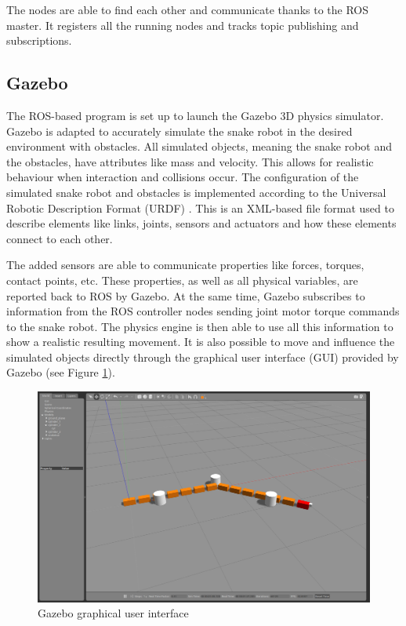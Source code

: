 The nodes are able to find each other and communicate thanks to the ROS master. It registers all the 
running nodes and tracks topic publishing and subscriptions.

\subsection{Gazebo}

The ROS-based program is set up to launch the Gazebo 3D physics simulator. Gazebo is adapted to accurately simulate the snake robot in the desired environment with obstacles. All simulated objects, meaning the snake robot and the obstacles, have attributes like mass and velocity. This allows for realistic behaviour when interaction and collisions occur. The configuration of the simulated snake robot and obstacles is implemented according to the Universal Robotic Description Format (URDF) \cite{urdfWeb}. This is an XML-based file format used to describe elements like links, joints, sensors and actuators and how these elements connect to each other.

The added sensors are able to communicate properties like forces, torques, contact points, etc. These properties, as well as all physical variables, are reported back to ROS by Gazebo.
At the same time, Gazebo subscribes to information from the ROS controller nodes sending joint motor torque commands to the snake robot. The physics engine is then able to use all this information to show a realistic resulting movement. It is also possible to move and influence the simulated objects directly through the graphical user interface (GUI) provided by Gazebo (see Figure \ref{fig:gazebo_gui}).

\begin{figure}[h!]
    \centering
    \includegraphics[width=1\textwidth]{figures/simulator/gazebo_gen_screen.png}
    \caption{Gazebo graphical user interface}
    \label{fig:gazebo_gui}
\end{figure}